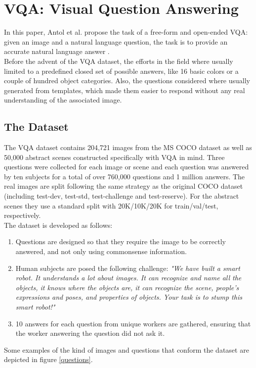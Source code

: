 \documentclass{article}
\begin{document}
\section{VQA: Visual Question Answering}\label{vqaSec}
In this paper, Antol et al. propose the task of a free-form and open-ended VQA: given an image and a natural language question, the task is to provide an accurate natural language answer \citep{iccvAntol15}.\\
Before the advent of the VQA dataset, the efforts in the field where usually limited to a predefined closed set of possible answers, like 16 basic colors or a couple of hundred object categories. Also, the questions considered where usually generated from templates, which made them easier to respond without any real understanding of the associated image.
\subsection{The Dataset}
The VQA dataset contains 204,721 images from the MS COCO dataset as well as 50,000 abstract scenes constructed specifically with VQA in mind. Three questions were collected for each image or scene and each question was answered by ten subjects for a total of over 760,000 questions and 1 million answers. The real images are split following the same strategy as the original COCO dataset (including test-dev, test-std, test-challenge and test-reserve). For the abstract scenes they use a standard split with 20K/10K/20K for train/val/test, respectively.\\
The dataset is developed as follows:
\begin{enumerate}
    \item Questions are designed so that they require the image to be correctly answered, and not only using commonsense information.
    \item Human subjects are posed the following challenge: \emph{"We have built a smart robot. It understands a lot about images. It can recognize and name all the objects, it knows where the objects are, it can recognize the scene, people's expressions and poses, and properties of objects. Your task is to stump this smart robot!"}
    \item 10 answers for each question from unique workers are gathered, ensuring that the worker answering the question did not ask it.
\end{enumerate}
Some examples of the kind of images and questions that conform the dataset are depicted in figure \ref{questions}.
\end{document}
